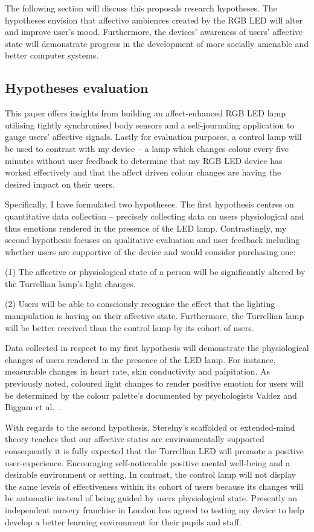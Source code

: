 \documentclass{sigchi}
\begin{document}
The following section will discuss this proposals research hypotheses. The hypotheses envision that affective ambiences created by the RGB LED will alter and improve user’s mood. Furthermore, the devices’ awareness of users’ affective state will demonstrate progress in the development of more socially amenable and better computer systems. 

\subsection{Hypotheses evaluation}

This paper offers insights from building an affect-enhanced RGB LED lamp utilising tightly synchronised body sensors and a self-journaling application to gauge users’ affective signals. Lastly for evaluation purposes, a control lamp will be used to contrast with my device – a lamp which changes colour every five minutes without user feedback to determine that my RGB LED device has worked effectively and that the affect driven colour changes are having the desired impact on their users.

Specifically, I have formulated two hypotheses. The first hypothesis centres on quantitative data collection – precisely collecting data on users physiological and thus emotions rendered in the presence of the LED lamp. Contrastingly, my second hypothesis focuses on qualitative evaluation and user feedback including whether users are supportive of the device and would consider purchasing one:

(1) The affective or physiological state of a person will be significantly altered by the Turrellian lamp’s light changes.

(2) Users will be able to consciously recognise the effect that the lighting manipulation is having on their affective state. Furthermore, the Turrellian lamp will be better received than the control lamp by its cohort of users.

Data collected in respect to my first hypothesis will demonstrate the physiological changes of users rendered in the presence of the LED lamp. For instance, measurable changes in heart rate, skin conductivity and palpitation. As previously noted, coloured light changes to render positive emotion for users will be determined by the colour palette’s documented by psychologists Valdez and Biggam et al.~\cite{biggam2006progress, valdez1994effects}. 

With regards to the second hypothesis, Sterelny’s scaffolded or extended-mind theory teaches that our affective states are environmentally supported~\cite{sterelny2010minds, sterelny2004externalism} consequently it is fully expected that the Turrellian LED will promote a positive user-experience. Encouraging self-noticeable positive mental well-being and a desirable environment or setting. In contrast, the control lamp will not display the same levels of effectiveness within its cohort of users because its changes will be automatic instead of being guided by users physiological state. Presently an independent nursery franchise in London has agreed to testing my device to help develop a better learning environment for their pupils and staff.
\end{document}
